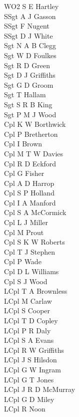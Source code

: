 \begin{multicols}{3}
  \footnotesize
  \noindent
  WO2 S E Hartley \\
  SSgt A J Gasson \\
  SSgt F Nugent \\
  SSgt D J White \\
  Sgt N A B Clegg \\
  Sgt W D Foulkes \\
  Sgt R D Green \\
  Sgt D J Griffiths \\
  Sgt G D Groom \\
  Sgt T Hallam \\
  Sgt S R B King \\
  Sgt P M J Wood \\
  Cpl K W Borthwick \\
  Cpl P Bretherton \\
  Cpl I Brown \\
  Cpl M T W Davies \\
  Cpl R D Eckford \\
  Cpl G Fisher \\
  Cpl A D Harrop \\
  Cpl S P Holland \\
  Cpl I A Manford \\
  Cpl S A McCormick \\
  Cpl L J Miller \\
  Cpl M Prout \\
  Cpl S K W Roberts \\
  Cpl T J Stephen \\
  Cpl P Wade \\
  Cpl D L Williams \\
  Cpl S J Wood \\
  LCpl T A Brownless \\
  LCpl M Carlaw \\
  LCpl S Cooper \\
  LCpl T D Copley \\
  LCpl P R Daly \\
  LCpl S A Evans \\
  LCpl R W Griffiths \\
  LCpl J S Hilsdon \\
  LCpl G W Ingram \\
  LCpl G T Jones \\
  LCpl J R D McMurray \\
  LCpl G D Miley \\
  LCpl R Noon \\

\end{multicols}
